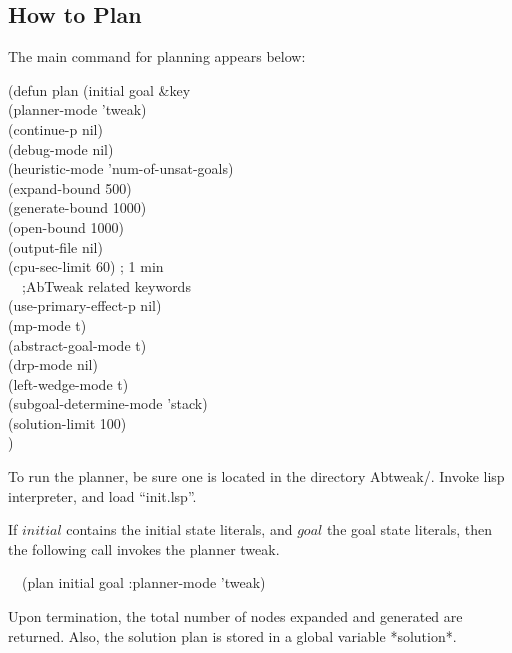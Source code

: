 \subsection{How to Plan}
The main command for planning appears below:
\begin{tabbing}
(defun plan (initial goal \&key \= \\
			     
\>                                 (planner-mode 'tweak)\\
\>				   (continue-p nil)\\
\>                                 (debug-mode      nil)\\
\>                                 (heuristic-mode 'num-of-unsat-goals)\\
\>                                 (expand-bound      500)\\
\>                                 (generate-bound   1000)\\
\>                                 (open-bound       1000)\\
\>  				   (output-file nil)\\
\>		 		   (cpu-sec-limit 60)   ; 1 min\\
~~;AbTweak related keywords\\
\>                                 (use-primary-effect-p  nil)\\
\>                                 (mp-mode  t)\\
\>                                 (abstract-goal-mode  t) \\
\>                                 (drp-mode         nil)\\
\>                                 (left-wedge-mode t)\\
\>                                 (subgoal-determine-mode  'stack)\\
\>				   (solution-limit 100)\\
\>               )
\end{tabbing}

To run the planner, be sure one is located in the directory Abtweak/.
Invoke lisp interpreter, and load ``init.lsp''.

If $initial$ contains the initial state literals, and $goal$ the goal
state literals, then the following call invokes the planner tweak.
\begin{tabbing}
~~(plan initial goal :planner-mode 'tweak)
\end{tabbing}

Upon termination, the total number of nodes expanded and generated are
returned. Also, the solution plan is stored in a global variable
*solution*.

